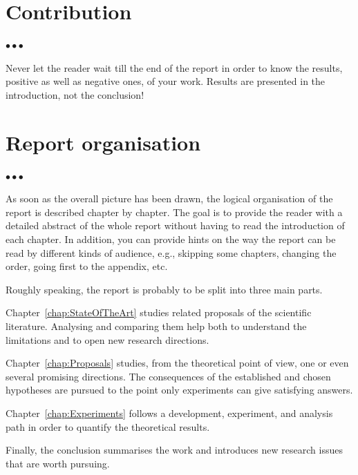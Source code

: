 \documentclass[11pt, english, screen, research-development]{report-rd-info}
\newenvironment{explanation}
{\color{blue}
 \begin{list}{}{\hspace{0.2\textwidth}\color{blue}}\item $\bullet\bullet\bullet$
}
{\end{list}}
\begin{document}
\section{Contribution}

\begin{explanation}
   Never let the reader wait till the end of the report in order to know the results, positive as well as negative ones, of your work.
   Results are presented in the introduction, not the conclusion!
\end{explanation}

\section{Report organisation}

\begin{explanation}
   As soon as the overall picture has been drawn, the logical organisation of the report is described chapter by chapter.
   The goal is to provide the reader with a detailed abstract of the whole report without having to read the introduction of each chapter.
   In addition, you can provide hints on the way the report can be read by different kinds of audience, e.g., skipping some chapters, changing the order, going first to the appendix, etc.

   Roughly speaking, the report is probably to be split into three main parts.

   Chapter~\ref{chap:StateOfTheArt} studies related proposals of the scientific literature.
   Analysing and comparing them help both to understand the limitations and to open new research directions.

   Chapter~\ref{chap:Proposals} studies, from the theoretical point of view, one or even several promising directions.
   The consequences of the established and chosen hypotheses are pursued to the point only experiments can give satisfying answers.

   Chapter~\ref{chap:Experiments} follows a development, experiment, and analysis path in order to quantify the theoretical results.

   Finally, the conclusion summarises the work and introduces new research issues that are worth pursuing.
\end{explanation}


\end{document}
